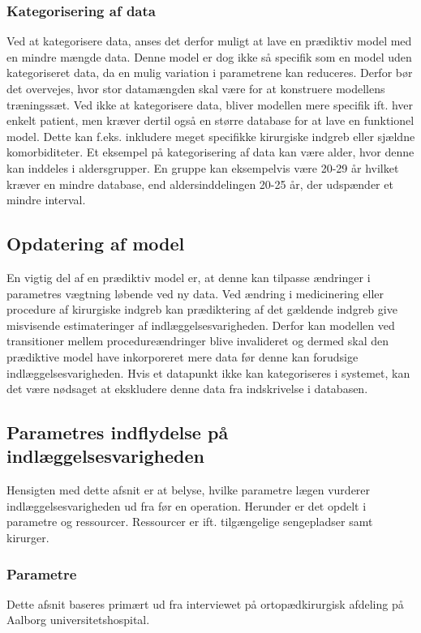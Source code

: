 \subsubsection{Kategorisering af data}
Ved at kategorisere data, anses det derfor muligt at lave en prædiktiv model med en mindre mængde data. Denne model er dog ikke så specifik som en model uden kategoriseret data, da en mulig variation i parametrene kan reduceres.\cite{Rowan2007} 
Derfor bør det overvejes, hvor stor datamængden skal være for at konstruere modellens træningssæt. Ved ikke at kategorisere data, bliver modellen mere specifik ift. hver enkelt patient, men kræver dertil også en større database for at lave en funktionel model. Dette kan f.eks. inkludere meget specifikke kirurgiske indgreb eller sjældne komorbiditeter. 
Et eksempel på kategorisering af data kan være alder, hvor denne kan inddeles i aldersgrupper. En gruppe kan eksempelvis være 20-29 år hvilket kræver en mindre database, end aldersinddelingen 20-25 år, der udspænder et mindre interval.\cite{Rowan2007}  

\subsection{Opdatering af model}
En vigtig del af en prædiktiv model er, at denne kan tilpasse ændringer i parametres vægtning løbende ved ny data.\cite{Kuhn2013} Ved ændring i medicinering eller procedure af kirurgiske indgreb kan prædiktering af det gældende indgreb give misvisende estimateringer af indlæggelsesvarigheden. Derfor kan modellen ved transitioner mellem procedureændringer blive invalideret og dermed skal den prædiktive model have inkorporeret mere data før denne kan forudsige indlæggelsesvarigheden. 
Hvis et datapunkt ikke kan kategoriseres i systemet, kan det være nødsaget at ekskludere denne data fra indskrivelse i databasen.

\subsection{Parametres indflydelse på indlæggelsesvarigheden}
Hensigten med dette afsnit er at belyse, hvilke parametre lægen vurderer indlæggelsesvarigheden ud fra før en operation. Herunder er det opdelt i parametre og ressourcer. Ressourcer er ift. tilgængelige sengepladser samt kirurger. 


\subsubsection{Parametre}
Dette afsnit baseres primært ud fra interviewet på ortopædkirurgisk afdeling på Aalborg universitetshospital. 


